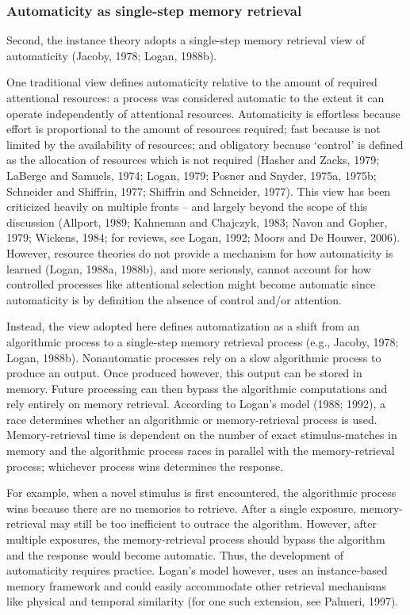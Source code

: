 \documentclass[]{DissertateCUNY}
\begin{document}
\hypertarget{automaticity-as-single-step-memory-retrieval}{%
\subsubsection{Automaticity as single-step memory
retrieval}\label{automaticity-as-single-step-memory-retrieval}}

Second, the instance theory adopts a single-step memory retrieval view
of automaticity (Jacoby, 1978; Logan, 1988b).

One traditional view defines automaticity relative to the amount of
required attentional resources: a process was considered automatic to
the extent it can operate independently of attentional resources.
Automaticity is effortless because effort is proportional to the amount
of resources required; fast because is not limited by the availability
of resources; and obligatory because `control' is defined as the
allocation of resources which is not required (Hasher and Zacks, 1979;
LaBerge and Samuels, 1974; Logan, 1979; Posner and Snyder, 1975a, 1975b;
Schneider and Shiffrin, 1977; Shiffrin and Schneider, 1977). This view
has been criticized heavily on multiple fronts -- and largely beyond the
scope of this discussion (Allport, 1989; Kahneman and Chajczyk, 1983;
Navon and Gopher, 1979; Wickens, 1984; for reviews, see Logan, 1992;
Moors and De Houwer, 2006). However, resource theories do not provide a
mechanism for how automaticity is learned (Logan, 1988a, 1988b), and
more seriously, cannot account for how controlled processes like
attentional selection might become automatic since automaticity is by
definition the absence of control and/or attention.

Instead, the view adopted here defines automatization as a shift from an
algorithmic process to a single-step memory retrieval process (e.g.,
Jacoby, 1978; Logan, 1988b). Nonautomatic processes rely on a slow
algorithmic process to produce an output. Once produced however, this
output can be stored in memory. Future processing can then bypass the
algorithmic computations and rely entirely on memory retrieval.
According to Logan's model (1988; 1992), a race determines whether an
algorithmic or memory-retrieval process is used. Memory-retrieval time
is dependent on the number of exact stimulus-matches in memory and the
algorithmic process races in parallel with the memory-retrieval process;
whichever process wins determines the response.

For example, when a novel stimulus is first encountered, the algorithmic
process wins because there are no memories to retrieve. After a single
exposure, memory-retrieval may still be too inefficient to outrace the
algorithm. However, after multiple exposures, the memory-retrieval
process should bypass the algorithm and the response would become
automatic. Thus, the development of automaticity requires practice.
Logan's model however, uses an instance-based memory framework and could
easily accommodate other retrieval mechanisms like physical and temporal
similarity (for one such extension, see Palmeri, 1997).
\end{document}
